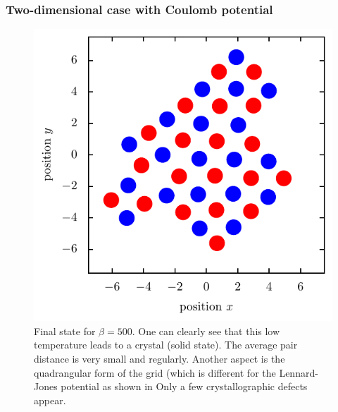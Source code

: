 \documentclass[11pt, a4paper]{article}
\numberwithin{equation}{section}
\begin{document}
\subsubsection{Two-dimensional case with Coulomb potential} \label{sec:2d_coulomb_vis}
\begin{figure}[!h]
\centering
\includegraphics[scale=1]{figures/Kristall_3_beta_500.pdf}
\caption{Final state for $\beta = 500$. 
One can clearly see that this low temperature leads to a crystal (solid state). 
The average pair distance is very small and regularly.
Another aspect is the quadrangular form of the grid (which is different for the Lennard-Jones potential as shown in 
Only a few crystallographic defects appear.}
\end{figure}
\end{document}
